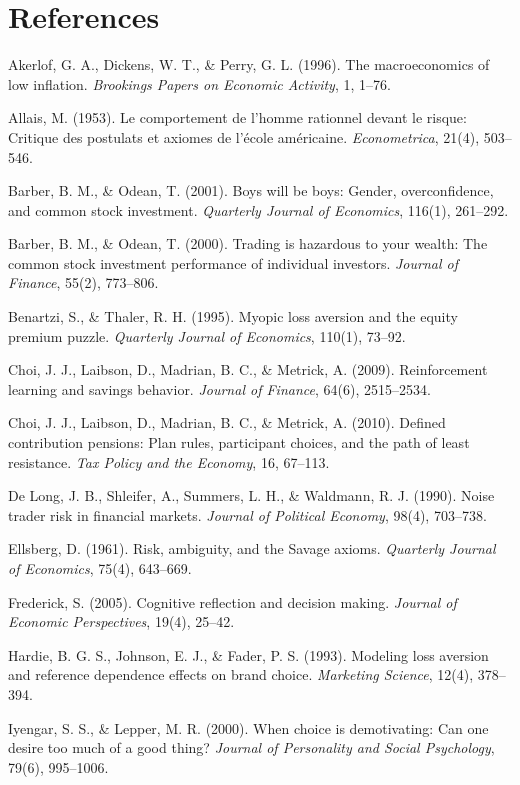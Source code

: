 \documentclass[12pt, letterpaper]{article}
\begin{document}
\newpage


\section*{References}


Akerlof, G. A., Dickens, W. T., \& Perry, G. L. (1996). The macroeconomics of low inflation. \textit{Brookings Papers on Economic Activity}, 1, 1--76.

Allais, M. (1953). Le comportement de l'homme rationnel devant le risque: Critique des postulats et axiomes de l'école américaine. \textit{Econometrica}, 21(4), 503--546.

Barber, B. M., \& Odean, T. (2001). Boys will be boys: Gender, overconfidence, and common stock investment. \textit{Quarterly Journal of Economics}, 116(1), 261--292.

Barber, B. M., \& Odean, T. (2000). Trading is hazardous to your wealth: The common stock investment performance of individual investors. \textit{Journal of Finance}, 55(2), 773--806.

Benartzi, S., \& Thaler, R. H. (1995). Myopic loss aversion and the equity premium puzzle. \textit{Quarterly Journal of Economics}, 110(1), 73--92.

Choi, J. J., Laibson, D., Madrian, B. C., \& Metrick, A. (2009). Reinforcement learning and savings behavior. \textit{Journal of Finance}, 64(6), 2515--2534.

Choi, J. J., Laibson, D., Madrian, B. C., \& Metrick, A. (2010). Defined contribution pensions: Plan rules, participant choices, and the path of least resistance. \textit{Tax Policy and the Economy}, 16, 67--113.

De Long, J. B., Shleifer, A., Summers, L. H., \& Waldmann, R. J. (1990). Noise trader risk in financial markets. \textit{Journal of Political Economy}, 98(4), 703--738.

Ellsberg, D. (1961). Risk, ambiguity, and the Savage axioms. \textit{Quarterly Journal of Economics}, 75(4), 643--669.

Frederick, S. (2005). Cognitive reflection and decision making. \textit{Journal of Economic Perspectives}, 19(4), 25--42.

Hardie, B. G. S., Johnson, E. J., \& Fader, P. S. (1993). Modeling loss aversion and reference dependence effects on brand choice. \textit{Marketing Science}, 12(4), 378--394.

Iyengar, S. S., \& Lepper, M. R. (2000). When choice is demotivating: Can one desire too much of a good thing? \textit{Journal of Personality and Social Psychology}, 79(6), 995--1006.
\end{document}
